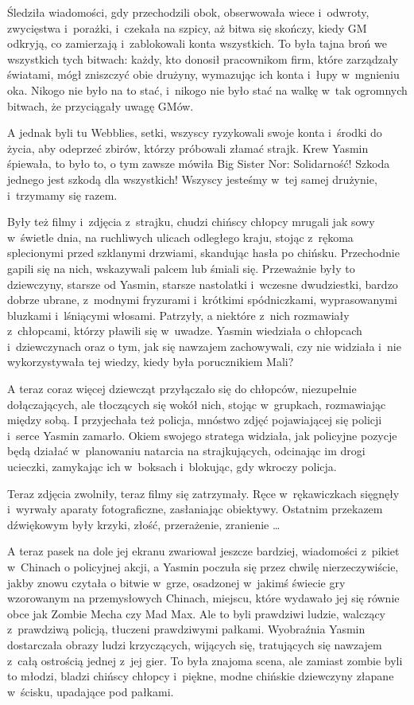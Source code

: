 \documentclass[oneside,polish,11pt,rmheadings]{mwbk}
\begin{document}
Śledziła wiadomości, gdy przechodzili obok, obserwowała wiece i~odwroty, zwycięstwa i~porażki, i~czekała na szpicy, aż bitwa się skończy, kiedy GM odkryją, co zamierzają i~zablokowali konta wszystkich. To była tajna broń we wszystkich tych bitwach: każdy, kto donosił pracownikom firm, które zarządzały światami, mógł zniszczyć obie drużyny, wymazując ich konta i~łupy w~mgnieniu oka. Nikogo nie było na to stać, i~nikogo nie było stać na walkę w~tak ogromnych bitwach, że przyciągały uwagę GMów.

A jednak byli tu Webblies, setki, wszyscy ryzykowali swoje konta i~środki do życia, aby odeprzeć zbirów, którzy próbowali złamać strajk. Krew Yasmin śpiewała, to było to, o tym zawsze mówiła Big Sister Nor: Solidarność! Szkoda jednego jest szkodą dla wszystkich! Wszyscy jesteśmy w~tej samej drużynie, i~trzymamy się razem.

Były też filmy i~zdjęcia z~strajku, chudzi chińscy chłopcy mrugali jak sowy w~świetle dnia, na ruchliwych ulicach odległego kraju, stojąc z~rękoma splecionymi przed szklanymi drzwiami, skandując hasła po chińsku. Przechodnie gapili się na nich, wskazywali palcem lub śmiali się. Przeważnie były to dziewczyny, starsze od Yasmin, starsze nastolatki i~wczesne dwudziestki, bardzo dobrze ubrane, z~modnymi fryzurami i~krótkimi spódniczkami, wyprasowanymi bluzkami i~lśniącymi włosami. Patrzyły, a niektóre z~nich rozmawiały z~chłopcami, którzy pławili się w~uwadze. Yasmin wiedziała o chłopcach i~dziewczynach oraz o tym, jak się nawzajem zachowywali, czy nie widziała i~nie wykorzystywała tej wiedzy, kiedy była porucznikiem Mali?

A teraz coraz więcej dziewcząt przyłączało się do chłopców, niezupełnie dołączających, ale tłoczących się wokół nich, stojąc w~grupkach, rozmawiając między sobą. I przyjechała też policja, mnóstwo zdjęć pojawiającej się policji i~serce Yasmin zamarło. Okiem swojego stratega widziała, jak policyjne pozycje będą działać w~planowaniu natarcia na strajkujących, odcinając im drogi ucieczki, zamykając ich w~boksach i~blokując, gdy wkroczy policja.

Teraz zdjęcia zwolniły, teraz filmy się zatrzymały. Ręce w~rękawiczkach sięgnęły i~wyrwały aparaty fotograficzne, zasłaniając obiektywy. Ostatnim przekazem dźwiękowym były krzyki, złość, przerażenie, zranienie \ldots 

A teraz pasek na dole jej ekranu zwariował jeszcze bardziej, wiadomości z~pikiet w~Chinach o policyjnej akcji, a Yasmin poczuła się przez chwilę nierzeczywiście, jakby znowu czytała o bitwie w~grze, osadzonej w~jakimś świecie gry wzorowanym na przemysłowych Chinach, miejscu, które wydawało jej się równie obce jak Zombie Mecha czy Mad Max. Ale to byli prawdziwi ludzie, walczący z~prawdziwą policją, tłuczeni prawdziwymi pałkami. Wyobraźnia Yasmin dostarczała obrazy ludzi krzyczących, wijących się, tratujących się nawzajem z~całą ostrością jednej z~jej gier. To była znajoma scena, ale zamiast zombie byli to młodzi, bladzi chińscy chłopcy i~piękne, modne chińskie dziewczyny złapane w~ścisku, upadające pod pałkami.
\end{document}
